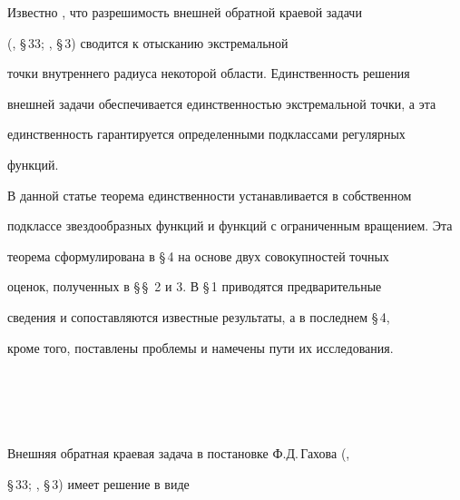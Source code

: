 \pagestyle{plain} %













\maketitle


\label{begin}





Известно \cite{1}, что разрешимость внешней обратной краевой задачи


(\cite{2}, \S\,33; \cite{3}, \S\,3) сводится к отысканию экстремальной


точки внутреннего радиуса некоторой области. Единственность решения


внешней задачи обеспечивается единственностью экстремальной точки, а эта


единственность гарантируется определенными подклассами регулярных


функций.





В данной статье теорема единственности устанавливается в собственном


подклассе звездообразных функций и функций с ограниченным вращением. Эта


теорема сформулирована в \S\,4 на основе двух совокупностей точных


оценок, полученных в \S\,\S~2 и 3. В \S\,1 приводятся предварительные


сведения и сопоставляются известные результаты, а в последнем \S\,4,


кроме того, поставлены проблемы и намечены пути их исследования.





\section{\ }





Внешняя обратная краевая задача в постановке Ф.Д.\,Гахова (\cite{2},


\S\,33; \cite{3}, \S\,3) имеет решение в виде


